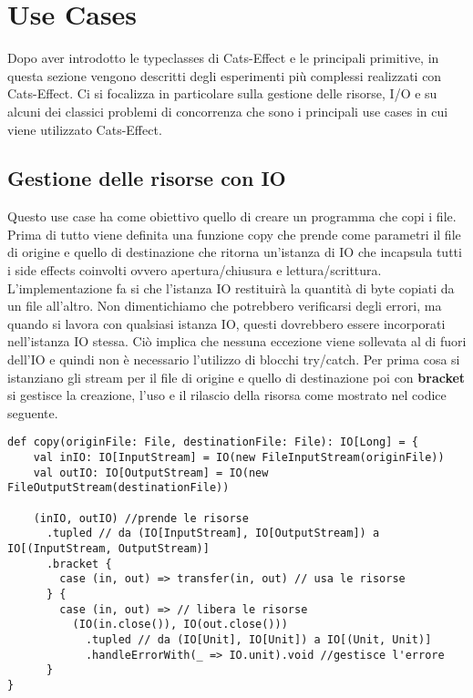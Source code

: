 \chapter{Use Cases}

Dopo aver introdotto le typeclasses di Cats-Effect e le principali primitive, in questa sezione vengono descritti degli esperimenti più complessi realizzati con Cats-Effect. Ci si focalizza in particolare sulla gestione delle risorse, I/O e su alcuni dei classici problemi di concorrenza che sono i principali use cases in cui viene utilizzato Cats-Effect.

\section{Gestione delle risorse con IO}
Questo use case ha come obiettivo quello di creare un programma che copi i file. Prima di tutto viene definita una funzione copy che prende come parametri il file di origine e quello di destinazione che ritorna un’istanza di IO che incapsula tutti i side effects coinvolti ovvero 
apertura/chiusura e lettura/scrittura. L'implementazione fa si che l’istanza IO restituirà la quantità di byte copiati da un file all’altro. Non dimentichiamo che potrebbero verificarsi degli errori, ma quando si lavora con qualsiasi istanza IO, questi dovrebbero essere incorporati nell’istanza IO stessa. Ciò implica che nessuna eccezione viene sollevata al di fuori dell’IO e quindi non è necessario l'utilizzo di blocchi try/catch. Per prima cosa si istanziano gli stream per il file di origine e quello di destinazione poi con \textbf{bracket} si gestisce la creazione, l’uso e il rilascio della risorsa come mostrato nel codice seguente.

\begin{verbatim}
def copy(originFile: File, destinationFile: File): IO[Long] = {
    val inIO: IO[InputStream] = IO(new FileInputStream(originFile))
    val outIO: IO[OutputStream] = IO(new FileOutputStream(destinationFile))

    (inIO, outIO) //prende le risorse
      .tupled // da (IO[InputStream], IO[OutputStream]) a IO[(InputStream, OutputStream)]
      .bracket {
        case (in, out) => transfer(in, out) // usa le risorse
      } {
        case (in, out) => // libera le risorse
          (IO(in.close()), IO(out.close()))
            .tupled // da (IO[Unit], IO[Unit]) a IO[(Unit, Unit)]
            .handleErrorWith(_ => IO.unit).void //gestisce l'errore
      }
}
\end{verbatim}

